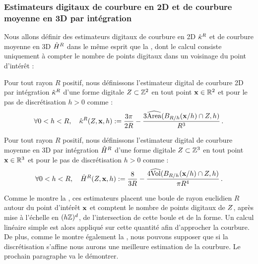 \subsubsection{Estimateurs digitaux de courbure en 2D et de courbure moyenne en 3D par intégration}
%
Nous allons définir des estimateurs digitaux de courbure en 2D $\hat{\kappa}^{R}$ et de
courbure moyenne en 3D $\hat{H}^{R}$ dans le même esprit que la
, dont le calcul consiste uniquement à
compter le nombre de points digitaux dans un voisinage du point d'intérêt :
%
\begin{definition}{}\label{def:digital-2d-curvature}
  Pour tout rayon $R$ positif, nous définissons l'estimateur digital de courbure
  2D par intégration $\hat{\kappa}^{R}$ d'une forme digitale $Z \subset \mathbb{Z}^2$
  en tout point $\mathbf{x} \in \mathbb{R}^2$ et pour le pas de discrétisation $h > 0$ comme :
  \begin{equation}
    \forall 0 < h < R,\quad \hat{\kappa}^{R}(Z,\mathbf{x},h) := \frac{3\pi}{2R} - \frac{3\widehat{\mathrm{Area}}(B_{R/h}(\mathbf{x}/h) \cap Z, h)}{R^3}\,.
  \end{equation}
\end{definition}
%
\begin{definition}{}\label{def:digital-3d-mean-curvature}
  Pour tout rayon $R$ positif, nous définissons l'estimateur digital de courbure
  moyenne en 3D par intégration $\hat{H}^{R}$ d'une forme digitale $Z
  \subset \mathbb{Z}^3$ en tout point $\mathbf{x} \in \mathbb{R}^3$ et pour le pas de discrétisation $h >
  0$ comme :
  \begin{equation}
    \forall 0 < h < R,\quad \hat{H}^{R}(Z,\mathbf{x},h) := \frac{8}{3R} - \frac{4\widehat{\mathrm{Vol}}(B_{R/h}(\mathbf{x}/h) \cap Z, h)}{\pi R^4}\,.
  \end{equation}
\end{definition}
%
Comme le montre la , ces estimateurs placent
une boule de rayon euclidien $R$ autour du point d'intérêt $\mathbf{x}$ et comptent le
nombre de points digitaux de $Z$, après mise à l'échelle en $(h\mathbb{Z})^d$,
de l'intersection de cette boule et de la forme. Un calcul linéaire simple est
alors appliqué sur cette quantité afin d'approcher la courbure. De plus, comme
le montre également la , nous pouvons supposer
que si la discrétisation s'affine nous aurons une meilleure estimation de la
courbure. Le prochain paragraphe va le démontrer.
%
